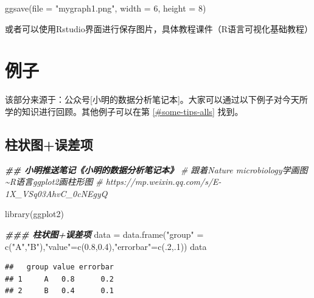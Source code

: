 \documentclass[
]{book}
\newenvironment{Shaded}{\begin{snugshade}}{\end{snugshade}}
\newcommand{\AttributeTok}[1]{\textcolor[rgb]{0.77,0.63,0.00}{#1}}
\newcommand{\CommentTok}[1]{\textcolor[rgb]{0.56,0.35,0.01}{\textit{#1}}}
\newcommand{\DecValTok}[1]{\textcolor[rgb]{0.00,0.00,0.81}{#1}}
\newcommand{\DocumentationTok}[1]{\textcolor[rgb]{0.56,0.35,0.01}{\textbf{\textit{#1}}}}
\newcommand{\FloatTok}[1]{\textcolor[rgb]{0.00,0.00,0.81}{#1}}
\newcommand{\FunctionTok}[1]{\textcolor[rgb]{0.00,0.00,0.00}{#1}}
\newcommand{\NormalTok}[1]{#1}
\newcommand{\OtherTok}[1]{\textcolor[rgb]{0.56,0.35,0.01}{#1}}
\newcommand{\StringTok}[1]{\textcolor[rgb]{0.31,0.60,0.02}{#1}}
\begin{document}
\begin{Shaded}
\begin{Highlighting}[]
\FunctionTok{ggsave}\NormalTok{(}\AttributeTok{file =} \StringTok{"mygraph1.png"}\NormalTok{, }\AttributeTok{width =} \DecValTok{6}\NormalTok{, }\AttributeTok{height =} \DecValTok{8}\NormalTok{)}
\end{Highlighting}
\end{Shaded}

或者可以使用Rstudio界面进行保存图片，具体教程课件（R语言可视化基础教程）

\hypertarget{ux4f8bux5b50}{%
\section{例子}\label{ux4f8bux5b50}}

该部分来源于：公众号{[}小明的数据分析笔记本{]}。大家可以通过以下例子对今天所学的知识进行回顾。其他例子可以在第 \ref{#some-tips-alls} 找到。

\hypertarget{ux67f1ux72b6ux56feux8befux5deeux9879}{%
\subsection{柱状图+误差项}\label{ux67f1ux72b6ux56feux8befux5deeux9879}}

\begin{Shaded}
\begin{Highlighting}[]
\DocumentationTok{\#\# 小明推送笔记《小明的数据分析笔记本》}
\CommentTok{\# 跟着Nature microbiology学画图\textasciitilde{}R语言ggplot2画柱形图 }
\CommentTok{\# https://mp.weixin.qq.com/s/E{-}1X\_VSq03AhvC\_0cNEgyQ}

\FunctionTok{library}\NormalTok{(ggplot2)}

\DocumentationTok{\#\#\# 柱状图+误差项}
\NormalTok{data }\OtherTok{=} \FunctionTok{data.frame}\NormalTok{(}\StringTok{"group"} \OtherTok{=} \FunctionTok{c}\NormalTok{(}\StringTok{"A"}\NormalTok{,}\StringTok{"B"}\NormalTok{),}\StringTok{"value"}\OtherTok{=}\FunctionTok{c}\NormalTok{(}\FloatTok{0.8}\NormalTok{,}\FloatTok{0.4}\NormalTok{),}\StringTok{"errorbar"}\OtherTok{=}\FunctionTok{c}\NormalTok{(.}\DecValTok{2}\NormalTok{,.}\DecValTok{1}\NormalTok{))}
\NormalTok{data}
\end{Highlighting}
\end{Shaded}

\begin{verbatim}
##   group value errorbar
## 1     A   0.8      0.2
## 2     B   0.4      0.1
\end{verbatim}
\end{document}
